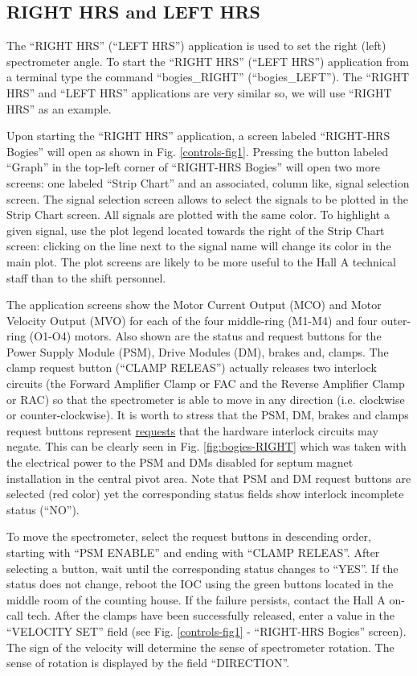 {\subsection{RIGHT HRS and LEFT HRS}
The ``RIGHT HRS'' (``LEFT HRS'') application is used to set the right (left)
spectrometer angle.
To start the ``RIGHT HRS'' (``LEFT HRS'')
application from a terminal type the command ``bogies\_RIGHT'' (``bogies\_LEFT'').
The ``RIGHT HRS'' and ``LEFT HRS'' applications are very similar so, we will
use ``RIGHT HRS'' as an example.

Upon starting the ``RIGHT HRS'' application, 
a screen labeled ``RIGHT-HRS Bogies'' will open as shown in
Fig. \ref{controls-fig1}.
Pressing the button labeled ``Graph'' in the top-left corner of ``RIGHT-HRS Bogies''
will open two more screens: one labeled ``Strip Chart'' and an associated, column like,
signal selection screen. The signal selection screen allows to select the signals
to be plotted in the Strip Chart screen. All signals are plotted with the same color.
To highlight a given signal,
use the plot legend located towards the right of the Strip Chart screen: clicking on the line next
to the signal name will change its color in the main plot.
The plot screens are likely to be more useful to the Hall A technical staff than to the
shift personnel.

The application screens show the Motor Current Output (MCO) and Motor Velocity Output (MVO) for each
of the four middle-ring (M1-M4) and four outer-ring (O1-O4) motors.
Also shown are the status and request buttons for the Power Supply Module (PSM),
Drive Modules (DM),
brakes and, clamps. The clamp request button (``CLAMP RELEAS'') actually releases two interlock
circuits (the Forward Amplifier Clamp or FAC and the Reverse Amplifier Clamp or RAC)
so that the spectrometer is
able to move in any direction (i.e. clockwise or counter-clockwise).
It is worth to stress that the PSM, DM, brakes and clamps request buttons represent
\underline{requests} that the hardware interlock circuits may negate. This can be clearly
seen 
in Fig. \ref{fig:bogies-RIGHT} which was taken with
the electrical power to the PSM and DMs disabled for septum magnet installation
in the central pivot area. Note that PSM and DM request buttons are selected (red color)
yet the corresponding status fields show interlock incomplete status (``NO'').

To move the spectrometer, select the request buttons in descending order, starting with
``PSM ENABLE'' and ending with ``CLAMP RELEAS''. After selecting a button, wait
until the corresponding status changes to ``YES''. 
If the status does not change, reboot
the IOC using the green buttons located in the middle room of the counting house.
If the failure persists, contact the Hall A on-call tech.
After the clamps have been successfully released, enter a value in the ``VELOCITY SET'' field
(see Fig. \ref{controls-fig1} - ``RIGHT-HRS Bogies'' screen). The sign of the velocity
will determine the sense of spectrometer rotation. The sense of rotation is displayed by the
field ``DIRECTION''.

}
